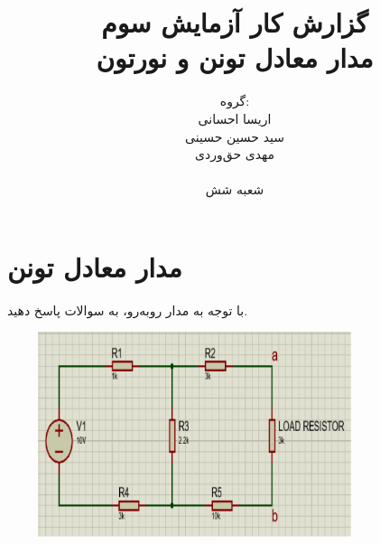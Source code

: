 \documentclass{article}
\title{
	گزارش کار آزمایش سوم \\ مدار معادل تونن و نورتون
}
\author{
	گروه: \\
	اریسا احسانی \\
	سید حسین حسینی \\
	مهدی حق‌وردی \\ \\
	شعبه شش
}
\date{}
\begin{document}
	\maketitle
	\tableofcontents
	\clearpage
	
	\section{مدار معادل تونن}
	
		با توجه به مدار رو‌به‌رو، به سوالات پاسخ دهید.
		\begin{center}
			\includegraphics[width=11cm, height=6cm]{./images/R3.1.1}
		\end{center}
	
\end{document}
